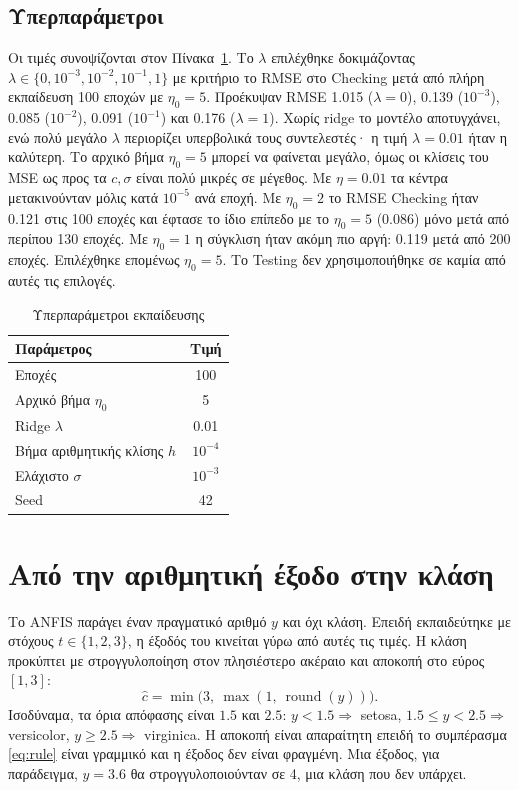 \documentclass[conference]{IEEEtran}
\begin{document}
\subsection{Υπερπαράμετροι}\label{sec:hyper}
Οι τιμές συνοψίζονται στον Πίνακα~\ref{tab:hyper}. Το $\lambda$ επιλέχθηκε
δοκιμάζοντας $\lambda\in\{0,10^{-3},10^{-2},10^{-1},1\}$ με κριτήριο το RMSE στο
Checking μετά από πλήρη εκπαίδευση 100 εποχών με $\eta_0=5$. Προέκυψαν
RMSE 1.015 ($\lambda=0$), 0.139 ($10^{-3}$), 0.085 ($10^{-2}$), 0.091 ($10^{-1}$)
και 0.176 ($\lambda=1$). Χωρίς ridge το μοντέλο αποτυγχάνει, ενώ πολύ μεγάλο $\lambda$
περιορίζει υπερβολικά τους συντελεστές· η τιμή $\lambda=0.01$ ήταν η καλύτερη. Το αρχικό βήμα $\eta_0=5$ μπορεί να φαίνεται μεγάλο,
όμως οι κλίσεις του MSE ως προς τα $c,\sigma$ είναι πολύ μικρές σε μέγεθος.
Με $\eta=0.01$ τα κέντρα μετακινούνταν μόλις κατά $10^{-5}$ ανά εποχή.
Με $\eta_0=2$ το RMSE Checking ήταν 0.121 στις 100 εποχές και έφτασε το ίδιο επίπεδο
με το $\eta_0=5$ (0.086) μόνο μετά από περίπου 130 εποχές. Με $\eta_0=1$ η σύγκλιση ήταν
ακόμη πιο αργή: 0.119 μετά από 200 εποχές. Επιλέχθηκε επομένως $\eta_0=5$.
Το Testing δεν χρησιμοποιήθηκε σε καμία από αυτές τις επιλογές.

\begin{table}[!t]
\centering
\caption{Υπερπαράμετροι εκπαίδευσης}
\label{tab:hyper}
\begin{tabular}{lc}
\toprule
Παράμετρος & Τιμή \\
\midrule
Εποχές & 100 \\
Αρχικό βήμα $\eta_0$ & 5 \\
Ridge $\lambda$ & 0.01 \\
Βήμα αριθμητικής κλίσης $h$ & $10^{-4}$ \\
Ελάχιστο $\sigma$ & $10^{-3}$ \\
Seed & 42 \\
\bottomrule
\end{tabular}
\end{table}

\section{Από την αριθμητική έξοδο στην κλάση}

Το ANFIS παράγει έναν πραγματικό αριθμό $y$ και όχι κλάση. Επειδή εκπαιδεύτηκε με
στόχους $t\in\{1,2,3\}$, η έξοδός του κινείται γύρω από αυτές τις τιμές. Η κλάση
προκύπτει με στρογγυλοποίηση στον πλησιέστερο ακέραιο και αποκοπή στο εύρος $[1,3]$:
\begin{equation}
\hat c=\min\bigl(3,\ \max(1,\ \operatorname{round}(y))\bigr).
\label{eq:class}
\end{equation}
Ισοδύναμα, τα όρια απόφασης είναι $1.5$ και $2.5$: $y<1.5\Rightarrow$ setosa,
$1.5\le y<2.5\Rightarrow$ versicolor, $y\ge2.5\Rightarrow$ virginica.
Η αποκοπή είναι απαραίτητη επειδή το συμπέρασμα \eqref{eq:rule} είναι γραμμικό
και η έξοδος δεν είναι φραγμένη. Μια έξοδος, για παράδειγμα, $y=3.6$ θα στρογγυλοποιούνταν σε 4,
μια κλάση που δεν υπάρχει.
\end{document}
